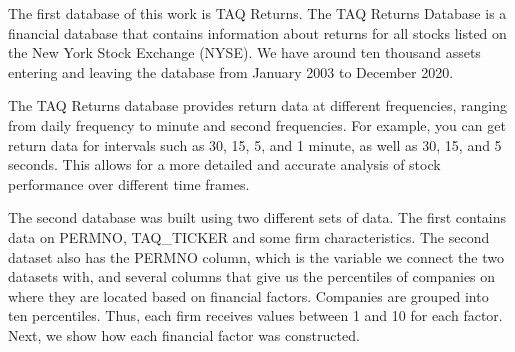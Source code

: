 The first database of this work is TAQ Returns. The TAQ Returns Database is a financial database that contains information about returns for all stocks listed on the New York Stock Exchange (NYSE). We have around ten thousand assets entering and leaving the database from January 2003 to December 2020.

The TAQ Returns database provides return data at different frequencies, ranging from daily frequency to minute and second frequencies. For example, you can get return data for intervals such as 30, 15, 5, and 1 minute, as well as 30, 15, and 5 seconds. This allows for a more detailed and accurate analysis of stock performance over different time frames.

The second database was built using two different sets of data. The first contains data on PERMNO, TAQ\_TICKER and some firm characteristics. The second dataset also has the PERMNO column, which is the variable we connect the two datasets with, and several columns that give us the percentiles of companies on where they are located based on financial factors. Companies are grouped into ten percentiles. Thus, each firm receives values between 1 and 10 for each factor. Next, we show how each financial factor was constructed.


